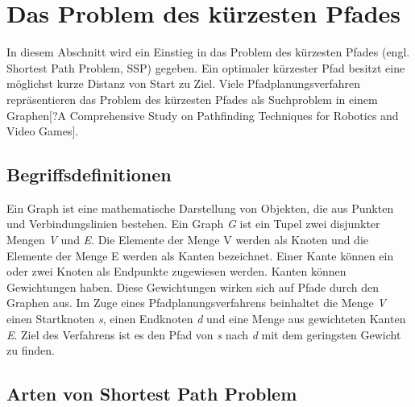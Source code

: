 \chapter{Das Problem des kürzesten Pfades}

In diesem Abschnitt wird ein Einstieg in das Problem des kürzesten Pfades (engl. Shortest Path Problem, SSP) gegeben. Ein optimaler kürzester Pfad besitzt eine möglichst kurze Distanz von Start zu Ziel\cite{Madkour.2017}. Viele Pfadplanungsverfahren repräsentieren das Problem des kürzesten Pfades als Suchproblem in einem Graphen[?A Comprehensive Study on Pathfinding Techniques for Robotics and Video Games]. %

\section{Begriffsdefinitionen}

Ein Graph ist eine mathematische Darstellung von Objekten, die aus Punkten und Verbindungslinien bestehen. Ein Graph \textit{G} ist ein Tupel zwei disjunkter Mengen \textit{V} und \textit{E}. Die Elemente der Menge V werden als Knoten und die Elemente der Menge E werden als Kanten bezeichnet. Einer Kante können ein oder zwei Knoten als Endpunkte zugewiesen werden. Kanten können Gewichtungen haben. Diese Gewichtungen wirken sich auf Pfade durch den Graphen aus\cite{Gross.2004}. Im Zuge eines Pfadplanungsverfahrens beinhaltet die Menge \textit{V} einen Startknoten \textit{s}, einen Endknoten \textit{d} und eine Menge aus gewichteten Kanten \textit{E}. %
Ziel des Verfahrens ist es den Pfad von \textit{s} nach \textit{d} mit dem geringsten Gewicht zu finden\cite{Madkour.2017}. 



\section{Arten von Shortest Path Problem}

